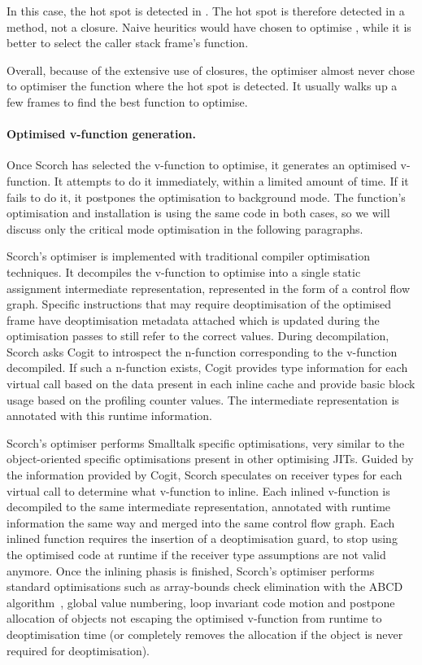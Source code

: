 \documentclass[a4paper,12pt,twoside]{../includes/ThesisStyle}
\begin{document}
In this case, the hot spot is detected in . The hot spot is therefore detected in a method, not a closure. Naive heuritics would have chosen to optimise , while it is better to select the caller stack frame's function.

Overall, because of the extensive use of closures, the optimiser almost never chose to optimiser the function where the hot spot is detected. It usually walks up a few frames to find the best function to optimise. 

\paragraph{Optimised v-function generation.}
Once Scorch has selected the v-function to optimise, it generates an optimised v-function. It attempts to do it immediately, within a limited amount of time. If it fails to do it, it postpones the optimisation to background mode. The function's optimisation and installation is using the same code in both cases, so we will discuss only the critical mode optimisation in the following paragraphs.

Scorch's optimiser is implemented with traditional compiler optimisation techniques. It decompiles the v-function to optimise into a single static assignment intermediate representation, represented in the form of a control flow graph. Specific instructions that may require deoptimisation of the optimised frame have deoptimisation metadata attached which is updated during the optimisation passes to still refer to the correct values. During decompilation, Scorch asks Cogit to introspect the n-function corresponding to the v-function decompiled. If such a n-function exists, Cogit provides type information for each virtual call based on the data present in each inline cache and provide basic block usage based on the profiling counter values. The intermediate representation is annotated with this runtime information.


Scorch's optimiser performs Smalltalk specific optimisations, very similar to the object-oriented specific optimisations present in other optimising JITs. Guided by the information provided by Cogit, Scorch speculates on receiver types for each virtual call to determine what v-function to inline. Each inlined v-function is decompiled to the same intermediate representation, annotated with runtime information the same way and merged into the same control flow graph. Each inlined function requires the insertion of a deoptimisation guard, to stop using the optimised code at runtime if the receiver type assumptions are not valid anymore. Once the inlining phasis is finished, Scorch's optimiser performs standard optimisations such as array-bounds check elimination with the ABCD algorithm~\cite{Bodi00a}, global value numbering, loop invariant code motion and postpone allocation of objects not escaping the optimised v-function from runtime to deoptimisation time (or completely removes the allocation if the object is never required for deoptimisation).
\end{document}
